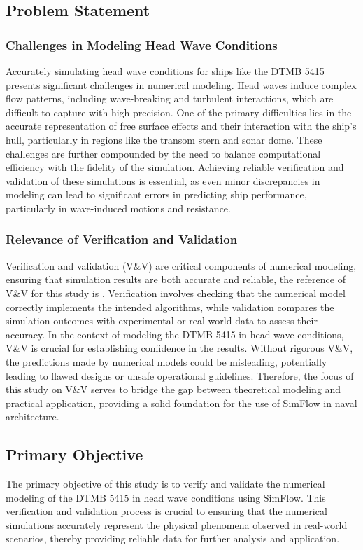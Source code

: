 \documentclass[12pt]{article} %
\begin{document}
\subsection{Problem Statement}
\subsubsection{Challenges in Modeling Head Wave Conditions}
Accurately simulating head wave conditions for ships like the DTMB 5415 presents significant 
challenges in numerical modeling. Head waves induce complex flow patterns, including wave-breaking 
and turbulent interactions, which are difficult to capture with high precision. One of the primary 
difficulties lies in the accurate representation of free surface effects and their interaction with 
the ship's hull, particularly in regions like the transom stern and sonar dome. These challenges are 
further compounded by the need to balance computational efficiency with the fidelity of the simulation. 
Achieving reliable verification and validation of these simulations is essential, as even minor 
discrepancies in modeling can lead to significant errors in predicting ship performance, particularly 
in wave-induced motions and resistance.

\subsubsection{Relevance of Verification and Validation}
Verification and validation (V\&V) are critical components of numerical modeling, ensuring that 
simulation results are both accurate and reliable, the reference of V\&V for this study is \cite{Begovic2017}. 
Verification involves checking that the 
numerical model correctly implements the intended algorithms, while validation compares the 
simulation outcomes with experimental or real-world data to assess their accuracy. In the 
context of modeling the DTMB 5415 in head wave conditions, V\&V is crucial for establishing 
confidence in the results. Without rigorous V\&V, the predictions made by numerical models 
could be misleading, potentially leading to flawed designs or unsafe operational guidelines. 
Therefore, the focus of this study on V\&V serves to bridge the gap between theoretical modeling 
and practical application, providing a solid foundation for the use of SimFlow in naval architecture.

\subsection{Primary Objective}
The primary objective of this study is to verify and validate the numerical modeling of the DTMB 5415 
in head wave conditions using SimFlow. This verification and validation process is crucial to 
ensuring that the numerical simulations accurately represent the physical phenomena observed in 
real-world scenarios, thereby providing reliable data for further analysis and application.
\end{document}

